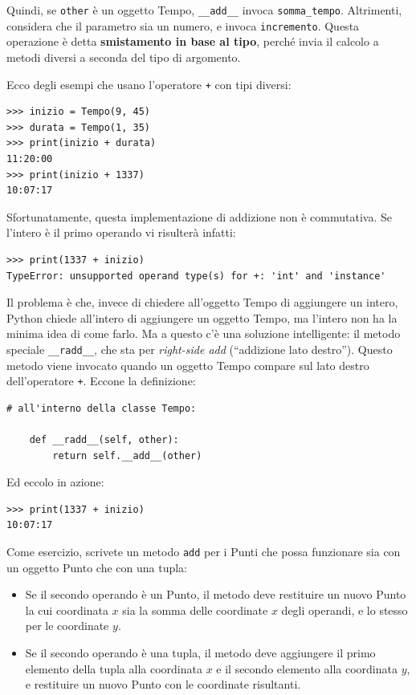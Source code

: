 \documentclass[10pt]{book}
\begin{document}
Quindi, se {\tt other} è un oggetto Tempo, \verb"__add__" invoca
\verb"somma_tempo".  Altrimenti, considera che il parametro sia un numero, e invoca {\tt incremento}.  Questa operazione è detta {\bf smistamento in base al tipo}, perché invia il calcolo a metodi diversi a seconda del tipo di argomento.

Ecco degli esempi che usano l'operatore {\tt +} con tipi diversi:

\begin{verbatim}
>>> inizio = Tempo(9, 45)
>>> durata = Tempo(1, 35)
>>> print(inizio + durata)
11:20:00
>>> print(inizio + 1337)
10:07:17
\end{verbatim}
%
Sfortunatamente, questa implementazione di addizione non è commutativa. Se l'intero è il primo operando vi risulterà infatti:

\begin{verbatim}
>>> print(1337 + inizio)
TypeError: unsupported operand type(s) for +: 'int' and 'instance'
\end{verbatim}
%
Il problema è che, invece di chiedere all'oggetto Tempo di aggiungere un intero, Python chiede all'intero di aggiungere un oggetto Tempo, ma l'intero non ha la minima idea di come farlo. Ma a questo c'è una soluzione intelligente: il metodo speciale \verb"__radd__", che sta per {\em right-side add} (``addizione lato destro'').
Questo metodo viene invocato quando un oggetto Tempo compare sul lato destro dell'operatore {\tt +}.  Eccone la definizione:

\begin{verbatim}
# all'interno della classe Tempo:

    def __radd__(self, other):
        return self.__add__(other)
\end{verbatim}
%
Ed eccolo in azione:

\begin{verbatim}
>>> print(1337 + inizio)
10:07:17
\end{verbatim}
%

Come esercizio, scrivete un metodo {\tt add} per i Punti che possa funzionare sia con un oggetto Punto che con una tupla:  

\begin{itemize}

\item Se il secondo operando è un Punto, il metodo deve restituire un nuovo Punto la cui coordinata $x$ sia la somma delle coordinate $x$ degli operandi, e lo stesso per le coordinate $y$.

\item Se il secondo operando è una tupla, il metodo deve aggiungere il primo elemento della tupla alla coordinata $x$ e il secondo elemento alla coordinata $y$, e restituire un nuovo Punto con le coordinate risultanti.

\end{itemize}
\end{document}
